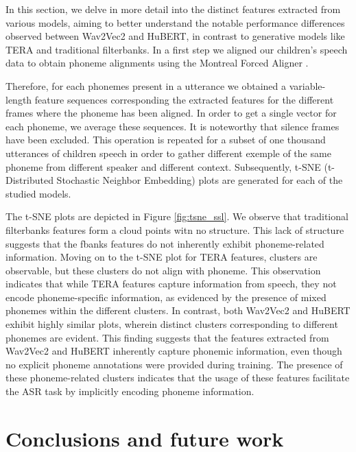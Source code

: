 In this section, we delve in more detail into the distinct features extracted from various models, aiming to better understand the notable performance differences observed between Wav2Vec2 and HuBERT, in contrast to generative models like TERA and traditional filterbanks. In a first step we aligned our children's speech data to obtain phoneme alignments using the Montreal Forced Aligner \cite{mcauliffe2017montreal}. %

Therefore, for each phonemes present in a utterance we obtained a variable-length feature sequences corresponding the extracted features for the different frames where the phoneme has been aligned. In order to get a single vector for each phoneme, we average these sequences. It is noteworthy that silence frames have been excluded. This operation is repeated for a subset of one thousand utterances of children speech in order to gather different exemple of the same phoneme from different speaker and different context. Subsequently, t-SNE (t-Distributed Stochastic Neighbor Embedding) plots are generated for each of the studied models. 

The t-SNE plots are depicted in Figure \ref{fig:tsne_ssl}. We observe that traditional filterbanks features form a cloud points witn no structure. This lack of structure suggests that the fbanks features do not inherently exhibit phoneme-related information.
Moving on to the t-SNE plot for TERA features, clusters are observable, but these clusters do not align with phoneme. This observation indicates that while TERA features capture information from speech, they not encode phoneme-specific information, as evidenced by the presence of mixed phonemes within the different clusters.
In contrast, both Wav2Vec2 and HuBERT exhibit highly similar plots, wherein distinct clusters corresponding to different phonemes are evident. This finding suggests that the features extracted from Wav2Vec2 and HuBERT inherently capture phonemic information, even though no explicit phoneme annotations were provided during training. The presence of these phoneme-related clusters indicates that the usage of these features facilitate the ASR task by implicitly encoding phoneme information.



\section{Conclusions and future work}

